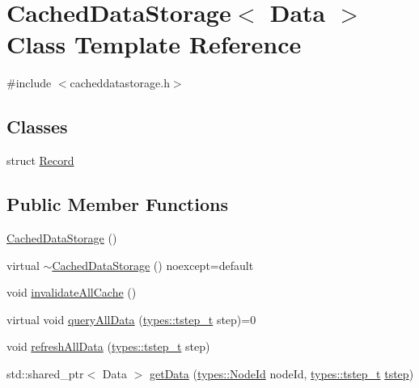 \hypertarget{class_cached_data_storage}{}\section{Cached\+Data\+Storage$<$ Data $>$ Class Template Reference}
\label{class_cached_data_storage}


{\ttfamily \#include $<$cacheddatastorage.\+h$>$}

\subsection*{Classes}
\begin{DoxyCompactItemize}
\item 
struct \mbox{\hyperlink{struct_cached_data_storage_1_1_record}{Record}}
\end{DoxyCompactItemize}
\subsection*{Public Member Functions}
\begin{DoxyCompactItemize}
\item 
\mbox{\hyperlink{class_cached_data_storage_a79129be295db29ebdab76a8c0b0d282b}{Cached\+Data\+Storage}} ()
\item 
virtual \mbox{\hyperlink{class_cached_data_storage_abf458791ffb3e5c625ac373e6dc138e0}{$\sim$\+Cached\+Data\+Storage}} () noexcept=default
\item 
void \mbox{\hyperlink{class_cached_data_storage_a40e294aa5a59d31fc5bd8ebfc9747689}{invalidate\+All\+Cache}} ()
\item 
virtual void \mbox{\hyperlink{class_cached_data_storage_aef2a92e8643673d541c5612d359ecc3d}{query\+All\+Data}} (\mbox{\hyperlink{namespacetypes_a9dc53a5ce11a196d82a6983030de8028}{types\+::tstep\+\_\+t}} step)=0
\item 
void \mbox{\hyperlink{class_cached_data_storage_a81f4ab2c55c8f5c2632db2dc27bcf5b5}{refresh\+All\+Data}} (\mbox{\hyperlink{namespacetypes_a9dc53a5ce11a196d82a6983030de8028}{types\+::tstep\+\_\+t}} step)
\item 
std\+::shared\+\_\+ptr$<$ Data $>$ \mbox{\hyperlink{class_cached_data_storage_aaea73b1bfa8a720e314e62e0bd4e268c}{get\+Data}} (\mbox{\hyperlink{classtypes_1_1_node_id}{types\+::\+Node\+Id}} node\+Id, \mbox{\hyperlink{namespacetypes_a9dc53a5ce11a196d82a6983030de8028}{types\+::tstep\+\_\+t}} \mbox{\hyperlink{thread__vessels_8cpp_a84bc73d278de929ec9974e1a95d9b23a}{tstep}})
\end{DoxyCompactItemize}
